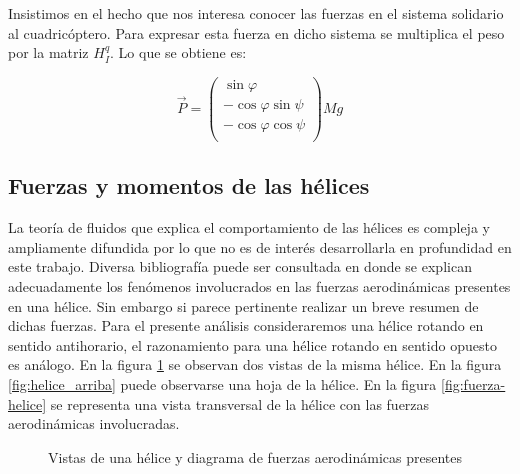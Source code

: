 \documentclass[main]{subfiles}
\begin{document}
Insistimos en el hecho que nos interesa conocer las fuerzas en el sistema solidario al cuadric\'optero. Para expresar esta fuerza en dicho sistema se multiplica el peso por la matriz $H_I^q$. Lo que se obtiene es:

$$
\vec{P}=\left(\begin{array}{c}
\sin\varphi\\
-\cos\varphi\sin\psi\\
-\cos\varphi\cos\psi\\
\end{array}\right)Mg
$$
\subsection{Fuerzas y momentos de las h\'elices}

La teor\'ia de fluidos que explica el comportamiento de las h\'elices es compleja y ampliamente difundida por lo que no es de inter\'es desarrollarla en profundidad en este trabajo. Diversa bibliograf\'ia puede ser consultada en donde se explican adecuadamente los fen\'omenos involucrados en las fuerzas aerodin\'amicas presentes en una h\'elice. Sin embargo si parece pertinente realizar un breve resumen de dichas fuerzas. Para el presente an\'alisis consideraremos una h\'elice rotando en sentido antihorario, el razonamiento para una h\'elice rotando en sentido opuesto es an\'alogo. En la figura \ref{fig:helice} se observan dos vistas de la misma h\'elice. En la figura \ref{fig:helice_arriba} puede observarse una hoja de la h\'elice. En la figura \ref{fig:fuerza-helice} se representa una vista transversal de la h\'elice con las fuerzas aerodin\'amicas involucradas.\\ 

\begin{figure} [h!]
  \centering
  \caption{Vistas de una h\'elice y diagrama de fuerzas aerodin\'amicas presentes}
  \label{fig:helice}
\end{figure}
\end{document}
